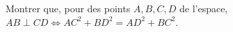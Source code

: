 Montrer que, pour des points $A, B, C, D$ de l'espace, $AB \perp CD \iff AC^2 + BD^2 = AD^2 + BC^2$.
